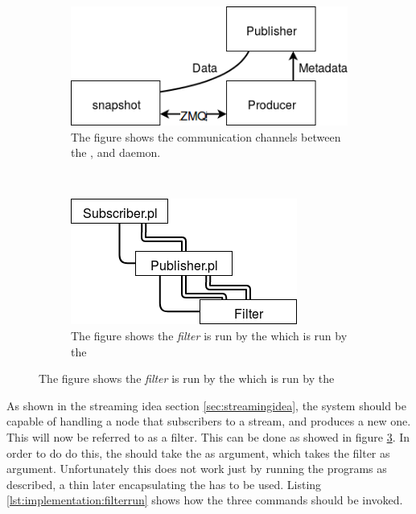 \begin{figure}[H]
    \centering
    \begin{subfigure}[b]{0.45\textwidth}
        \includegraphics[width=\textwidth]{figures/impl_example_snapshot_overview}
        \caption{The figure shows the communication channels between the \pub{}, \pro{} and  daemon.}
        \label{fig:implementation:dynamicmetadata}
    \end{subfigure}
    ~ %
    \begin{subfigure}[b]{0.45\textwidth}
        \includegraphics[width=\textwidth]{figures/impl_example_filter_overview}
        \caption{The figure shows the \textit{filter} is run by the \pub{} which is run by the \sub{}}
        \label{fig:implementation:filer}
    \end{subfigure}
\end{figure}

As shown in the streaming idea section \ref{sec:streamingidea}, the system should be capable of handling a node that subscribers to a stream, and produces a new one. This will now be referred to as a filter. This can be done as showed in figure \ref{fig:implementation:filer}. In order to do do this, the \sub{} should take the \pub{} as argument, which takes the filter as argument. Unfortunately this does not work just by running the programs as described, a thin  later encapsulating the \pub{} has to be used. Listing \ref{lst:implementation:filterrun} shows how the three commands should be invoked.


